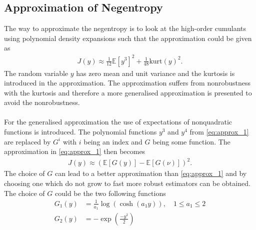 \subsection{Approximation of Negentropy}
The way to approximate the negentropy is to look at the high-order cumulants using polynomial density expansions such that the approximation could be given as
\begin{align}\label{eq:approx_1}
J(y) \approx \frac{1}{12} \mathbb{E}[y^3]^2 + \frac{1}{48} \text{kurt}(y)^2.
\end{align}
The random variable $y$ has zero mean and unit variance and the kurtosis is introduced in the approximation. The approximation suffers from nonrobustness with the kurtosis and therefore a more generalised approximation is presented to avoid the nonrobustness.
\\ \\
For the generalised approximation the use of expectations of nonquadratic functions is introduced. The polynomial functions $y^3$ and $y^4$ from \eqref{eq:approx_1} are replaced by $G^i$ with $i$ being an index and $G$ being some function. The approximation in \eqref{eq:approx_1} then becomes
\begin{align*}
J(y) \approx (\mathbb{E}[G(y)] - \mathbb{E}[G(\nu)])^2.
\end{align*}
The choice of $G$ can lead to a better approximation than \eqref{eq:approx_1} and by choosing one which do not grow to fast more robust estimators can be obtained. The choice of $G$ could be the two following functions
\begin{align*}
G_1 (y) &= \frac{1}{a_1} \log (\cosh(a_1 y)), \quad 1 \leq a_1 \leq 2 \\
G_2 (y) &= -\exp \left( \frac{-y^2}{2} \right)
\end{align*}


